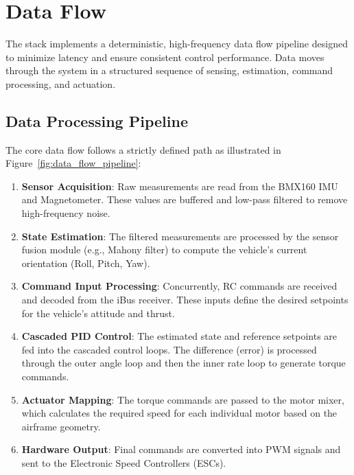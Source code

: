\section{Data Flow}
\label{sec:dataflow}

The stack implements a deterministic, high-frequency data flow pipeline designed to minimize latency and ensure consistent control performance. Data moves through the system in a structured sequence of sensing, estimation, command processing, and actuation.

\subsection{Data Processing Pipeline}

The core data flow follows a strictly defined path as illustrated in Figure~\ref{fig:data_flow_pipeline}:

\begin{enumerate}
    \item \textbf{Sensor Acquisition}: Raw measurements are read from the BMX160 IMU and Magnetometer. These values are buffered and low-pass filtered to remove high-frequency noise.
    \item \textbf{State Estimation}: The filtered measurements are processed by the sensor fusion module (e.g., Mahony filter) to compute the vehicle's current orientation (Roll, Pitch, Yaw).
    \item \textbf{Command Input Processing}: Concurrently, RC commands are received and decoded from the iBus receiver. These inputs define the desired setpoints for the vehicle's attitude and thrust.
    \item \textbf{Cascaded PID Control}: The estimated state and reference setpoints are fed into the cascaded control loops. The difference (error) is processed through the outer angle loop and then the inner rate loop to generate torque commands.
    \item \textbf{Actuator Mapping}: The torque commands are passed to the motor mixer, which calculates the required speed for each individual motor based on the airframe geometry.
    \item \textbf{Hardware Output}: Final commands are converted into PWM signals and sent to the Electronic Speed Controllers (ESCs).
\end{enumerate}

